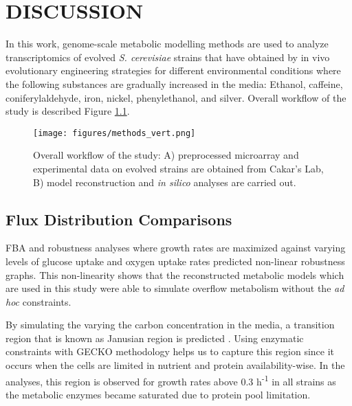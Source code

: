 \chapter{DISCUSSION}

In this work, genome-scale metabolic modelling methods are used to analyze transcriptomics of evolved \emph{S. cerevisiae} strains that have obtained by in vivo evolutionary engineering strategies for different environmental conditions where the following substances are gradually increased in the media: Ethanol, caffeine, coniferylaldehyde, iron, nickel, phenylethanol, and silver. Overall workflow of the study is described Figure \ref{fig:methods}.


\begin{figure} [H]
  \begin{center}
  \texttt{[image: figures/methods\_vert.png]}
  \caption[Overall workflow of the study: A) preprocessed microarray and experimental data on evolved strains are obtained from Cakar's Lab, B) model reconstruction and \emph{in silico} analyses are carried out.]{Overall workflow of the study: A) preprocessed microarray and experimental data on evolved strains are obtained from Cakar's Lab, B) model reconstruction and \emph{in silico} analyses are carried out. }
  \label{fig:methods}
  \end{center}
\end{figure}

\section{Flux Distribution Comparisons}
FBA and robustness analyses where growth rates are maximized against varying levels of glucose uptake and oxygen uptake rates predicted non-linear robustness graphs. This non-linearity shows that the reconstructed metabolic models which are used in this study were able to simulate overflow metabolism without the \emph{ad hoc} constraints.

By simulating the varying the carbon concentration in the media, a transition region that is known as Janusian region is predicted \cite{buttonbiochemical}. Using enzymatic constraints with GECKO methodology helps us to capture this region since it occurs when the cells are limited in nutrient and protein availability-wise. In the analyses, this region is observed for growth rates above 0.3 h\textsuperscript{-1} in all strains as the metabolic enzymes became saturated due to protein pool limitation.

